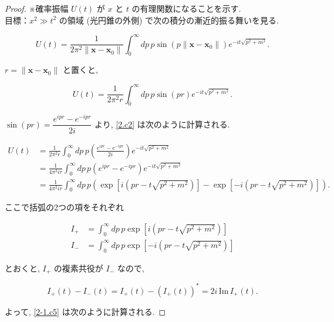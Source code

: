 \documentclass[a4paper,12pt]{article}
\begin{document}
\begin{proof} ※確率振幅 $U(t)$ が $x$ と $t$ の有理関数になることを示す.\\
目標：$x^2 \gg t^2$ の領域 (光円錐の外側) で次の積分の漸近的振る舞いを見る.

\begin{equation*}
  U(t) = \frac{1}{2\pi^2 \| \boldsymbol{x} - \boldsymbol{x}_0 \|} \int_0^\infty dp \, p \sin(p \| \boldsymbol{x} - \boldsymbol{x}_0 \|) e^{-it\sqrt{p^2 + m^2}}. \tag{2-1.c1}
\end{equation*}

$r = \| \boldsymbol{x} - \boldsymbol{x}_0 \|$ と置くと, 

\begin{equation*}\label{2.c2}
  U(t) = \frac{1}{2\pi^2 r} \int_0^\infty dp \, p \sin(p r) e^{-it\sqrt{p^2 + m^2}}. \tag{2-1.c2}
\end{equation*}

$\sin(p r) = \dfrac{e^{ipr} - e^{-ipr}}{2i}$ より, \eqref{2.c2} は次のように計算される.

\begin{align*}
  U(t) &= \frac{1}{2\pi^2 r} \int_0^\infty dp \, p \left( \frac{e^{ipr} - e^{-ipr}}{2i} \right) e^{-it\sqrt{p^2 + m^2}} \tag{2-1.c3}\\
  &= \frac{1}{4\pi^2 ir} \int_0^\infty dp \, p \left( e^{ipr} - e^{-ipr} \right) e^{-it\sqrt{p^2 + m^2}} \tag{2-1.c4} \\
  &= \frac{1}{4\pi^2 ir} \int_0^\infty dp \, p \left( \exp\left[i(pr - t\sqrt{p^2 + m^2})\right] - \exp\left[-i(pr - t\sqrt{p^2 + m^2})\right] \right). \label{2-1.c5}\tag{2-1.c5}
\end{align*}

ここで括弧の2つの項をそれぞれ

\begin{align*}
  I_+ &= \int_0^\infty dp \, p \exp\left[i(pr - t\sqrt{p^2 + m^2})\right] \tag{2-1.c6} \\
  I_- &= \int_0^\infty dp \, p \exp\left[-i(pr - t\sqrt{p^2 + m^2})\right] \tag{2-1.c7}
\end{align*}

とおくと, $I_+$ の複素共役が $I_-$ なので,

\begin{equation*}
  I_+(t) - I_-(t) = I_+(t) - (I_+(t))^* = 2i \, \textrm{Im}\, I_+(t). \tag{2-1.c8}
\end{equation*}

よって, \eqref{2-1.c5} は次のように計算される.


\end{proof}
\end{document}
